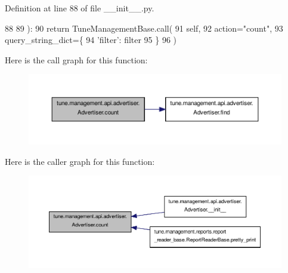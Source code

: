 Definition at line 88 of file \-\_\-\-\_\-init\-\_\-\-\_\-.\-py.


\begin{DoxyCode}
88 
89         ):
90         \textcolor{keywordflow}{return} TuneManagementBase.call(
91             self,
92             action=\textcolor{stringliteral}{"count"},
93             query\_string\_dict=\{
94                 \textcolor{stringliteral}{'filter'}: filter
95             \}
96         )

\end{DoxyCode}


Here is the call graph for this function\-:
\nopagebreak
\begin{figure}[H]
\begin{center}
\leavevmode
\includegraphics[width=350pt]{classtune_1_1management_1_1api_1_1advertiser_1_1Advertiser_a797fdee675b686bd1e3b0b9b3bcb6b98_cgraph}
\end{center}
\end{figure}




Here is the caller graph for this function\-:
\nopagebreak
\begin{figure}[H]
\begin{center}
\leavevmode
\includegraphics[width=350pt]{classtune_1_1management_1_1api_1_1advertiser_1_1Advertiser_a797fdee675b686bd1e3b0b9b3bcb6b98_icgraph}
\end{center}
\end{figure}


